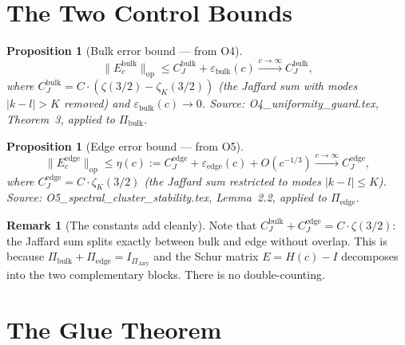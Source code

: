 \documentclass[12pt,a4paper]{amsart}
\newtheorem{proposition}[theorem]{Proposition}
\theoremstyle{definition}
\newtheorem{remark}[theorem]{Remark}
\newcommand{\PAi}{\Pi_{\mathrm{Airy}}}
\newcommand{\Pbulk}{\Pi_{\mathrm{bulk}}}
\newcommand{\Pedge}{\Pi_{\mathrm{edge}}}
\newcommand{\Ec}{E_c}
\newcommand{\norm}[1]{\|#1\|}
\begin{document}
\section{The Two Control Bounds}
\label{sec:control}

\begin{proposition}[Bulk error bound --- from O4]\label{prop:bulk}
\[
  \norm{\Ec^{\mathrm{bulk}}}_{\mathrm{op}}
  \le C_J^{\mathrm{bulk}} + \varepsilon_{\mathrm{bulk}}(c)
  \xrightarrow{c\to\infty} C_J^{\mathrm{bulk}},
\]
where $C_J^{\mathrm{bulk}} = C\cdot(\zeta(3/2) - \zeta_K(3/2))$
(the Jaffard sum with modes $|k-l| > K$ removed)
and $\varepsilon_{\mathrm{bulk}}(c) \to 0$.
Source: \textnormal{O4\_uniformity\_guard.tex}, Theorem~3, applied to $\Pbulk$.
\end{proposition}

\begin{proposition}[Edge error bound --- from O5]\label{prop:edge}
\[
  \norm{\Ec^{\mathrm{edge}}}_{\mathrm{op}}
  \le \eta(c) := C_J^{\mathrm{edge}} + \varepsilon_{\mathrm{edge}}(c) + O(c^{-1/3})
  \xrightarrow{c\to\infty} C_J^{\mathrm{edge}},
\]
where $C_J^{\mathrm{edge}} = C\cdot\zeta_K(3/2)$
(the Jaffard sum restricted to modes $|k-l| \le K$).
Source: \textnormal{O5\_spectral\_cluster\_stability.tex}, Lemma~2.2,
applied to $\Pedge$.
\end{proposition}

\begin{remark}[The constants add cleanly]
Note that $C_J^{\mathrm{bulk}} + C_J^{\mathrm{edge}} = C\cdot\zeta(3/2)$:
the Jaffard sum splits exactly between bulk and edge without overlap.
This is because $\Pbulk + \Pedge = I_{\PAi}$ and the Schur matrix
$E = H(c) - I$ decomposes into the two complementary blocks.
There is no double-counting.
\end{remark}

\section{The Glue Theorem}
\label{sec:glue}
\end{document}
